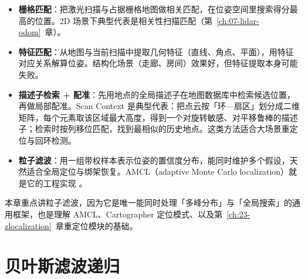 \begin{itemize}
  \item \textbf{栅格匹配}：把激光扫描与占据栅格地图做相关匹配，在位姿空间里搜索得分最高的位置。2D 场景下典型代表是相关性扫描匹配（第~\ref{ch:07-lidar-odom}~章）。
  \item \textbf{特征匹配}：从地图与当前扫描中提取几何特征（直线、角点、平面），用特征对应关系解算位姿。结构化场景（走廊、房间）效果好，但特征提取本身可能失败。
  \item \textbf{描述子检索 + 配准}：先用地点的全局描述子在地图数据库中检索候选位置，再做局部配准。Scan Context \cite{kim2018scancontext} 是典型代表：把点云按「环—扇区」划分成二维矩阵，每个元素取该区域最大高度，得到一个对旋转敏感、对平移鲁棒的描述子；检索时按列移位匹配，找到最相似的历史地点。这类方法适合大场景重定位与回环检测。
  \item \textbf{粒子滤波}：用一组带权样本表示位姿的置信度分布，能同时维护多个假设，天然适合全局定位与绑架恢复。AMCL（adaptive Monte Carlo localization）就是它的工程实现 \cite{fox2003amcl}。
\end{itemize}

本章重点讲粒子滤波，因为它是唯一能同时处理「多峰分布」与「全局搜索」的通用框架，也是理解 AMCL、Cartographer 定位模式、以及第~\ref{ch:23-zlocalization}~章重定位模块的基础。

\section{贝叶斯滤波递归}\label{sec:10-bayes}

